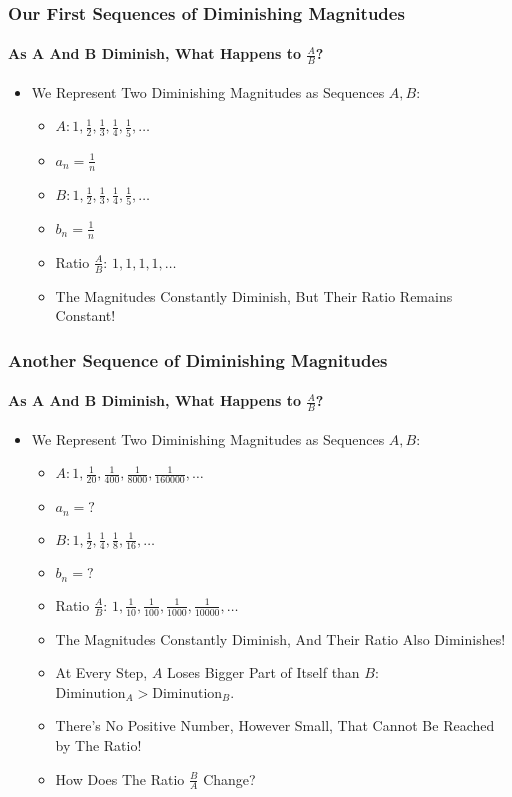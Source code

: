 \documentclass{beamer}
\begin{document}

\begin{frame}
\frametitle{Our First Sequences of Diminishing Magnitudes}
\framesubtitle{As A And B Diminish, What Happens to $\frac{A}{B}$?}
\label{slide:dimseq}
\begin{itemize}
\pause
\item We Represent Two Diminishing Magnitudes as Sequences $A,B$:
\begin{itemize}
\item $A: 1,\frac{1}{2},\frac{1}{3},\frac{1}{4},\frac{1}{5},\dots$
\item $a_n=\frac{1}{n}$
\item $B: 1,\frac{1}{2},\frac{1}{3},\frac{1}{4},\frac{1}{5},\dots$
\item $b_n=\frac{1}{n}$
\pause
\item Ratio $\frac{A}{B}$: $1,1,1,1,\dots$
\pause
\item The Magnitudes Constantly Diminish, But Their Ratio Remains Constant!
\end{itemize}
\end{itemize}
\end{frame}

\begin{frame}
\frametitle{Another Sequence of Diminishing Magnitudes}
\framesubtitle{As A And B Diminish, What Happens to $\frac{A}{B}$?}
\label{slide:dimseq2}
\begin{itemize}
\pause
\item We Represent Two Diminishing Magnitudes as Sequences $A,B$:
\begin{itemize}
\item $A: 1,\frac{1}{20},\frac{1}{400},\frac{1}{8000},\frac{1}{160000},\dots$
\item $a_n=?$
\item $B: 1,\frac{1}{2},\frac{1}{4},\frac{1}{8},\frac{1}{16},\dots$
\item $b_n=?$
\pause
\item Ratio $\frac{A}{B}$: $1,\frac{1}{10},\frac{1}{100},\frac{1}{1000},\frac{1}{10000},\dots$
\pause
\item The Magnitudes Constantly Diminish, And Their Ratio Also Diminishes!
\pause
\item At Every Step, $A$ Loses Bigger Part of Itself than $B$: $\text{Diminution}_A>\text{Diminution}_B$.
\pause
\item There's No Positive Number, However Small, That Cannot Be Reached by The Ratio!
\pause
\item How Does The Ratio $\frac{B}{A}$ Change?
\end{itemize}
\end{itemize}
\end{frame}
\end{document}
